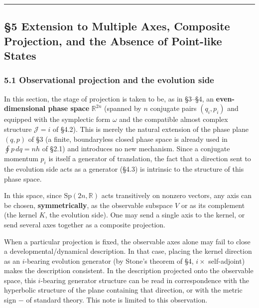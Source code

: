 \documentclass[
]{article}
\begin{document}
\begin{center}\rule{0.5\linewidth}{0.5pt}\end{center}

\subsection{§5 Extension to Multiple Axes, Composite Projection, and the
Absence of Point-like
States}\label{extension-to-multiple-axes-composite-projection-and-the-absence-of-point-like-states}

\subsubsection{5.1 Observational projection and the evolution
side}\label{observational-projection-and-the-evolution-side}

In this section, the stage of projection is taken to be, as in §3--§4,
an \textbf{even-dimensional phase space} \(\mathbb{R}^{2n}\) (spanned by
\(n\) conjugate pairs \((q_i,p_i)\) and equipped with the symplectic
form \(\omega\) and the compatible almost complex structure
\(\mathcal{J}=i\) of §4.2). This is merely the natural extension of the
phase plane \((q,p)\) of §3 (a finite, boundaryless closed phase space
is already used in \(\oint p\,dq=nh\) of §2.1) and introduces no new
mechanism. Since a conjugate momentum \(p_i\) is itself a generator of
translation, the fact that a direction sent to the evolution side acts
as a generator (§4.3) is intrinsic to the structure of this phase space.

In this space, since \(\mathrm{Sp}(2n,\mathbb{R})\) acts transitively on
nonzero vectors, any axis can be chosen, \textbf{symmetrically}, as the
observable subspace \(V\) or as its complement (the kernel \(K\), the
evolution side). One may send a single axis to the kernel, or send
several axes together as a composite projection.

When a particular projection is fixed, the observable axes alone may
fail to close a developmental/dynamical description. In that case,
placing the kernel direction as an \(i\)-bearing evolution generator (by
Stone's theorem of §4, \(i\times\) self-adjoint) makes the description
consistent. In the description projected onto the observable space, this
\(i\)-bearing generator structure can be read in correspondence with the
hyperbolic structure of the plane containing that direction, or with the
metric sign \(-\) of standard theory. This note is limited to this
observation.
\end{document}
